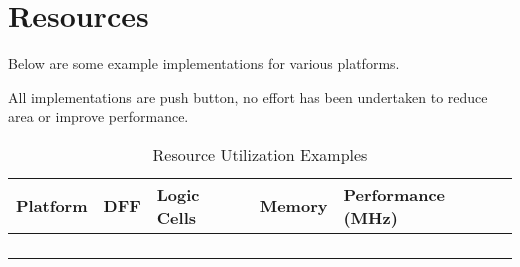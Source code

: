 \chapter{Resources} \label{resources}

Below are some example implementations for various platforms.

All implementations are push button, no effort has been undertaken to
reduce area or improve performance.

\begin{longtable}[]{@{}lllll@{}}
\toprule
Platform & DFF & Logic Cells & Memory & Performance (MHz)\tabularnewline
\midrule
\endhead
& & & &\tabularnewline
& & & &\tabularnewline
& & & &\tabularnewline
\bottomrule
\caption{Resource Utilization Examples}
\end{longtable}
